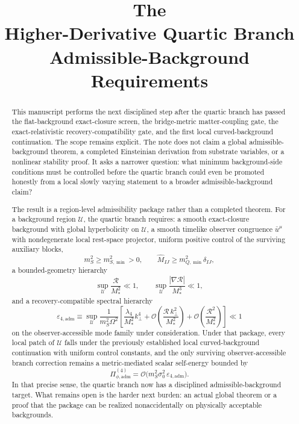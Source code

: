 \documentclass[11pt]{article}
\title{\textbf{The \TheoryName{}}\\[0.4em]
\large Higher-Derivative Quartic Branch Admissible-Background Requirements}
\author{}
\date{}
\begin{document}
\maketitle

\begin{abstract}
This manuscript performs the next disciplined step after the quartic branch has passed the flat-background exact-closure screen, the bridge-metric matter-coupling gate, the exact-relativistic recovery-compatibility gate, and the first local curved-background continuation. The scope remains explicit. The note does not claim a global admissible-background theorem, a completed Einsteinian derivation from substrate variables, or a nonlinear stability proof. It asks a narrower question: what minimum background-side conditions must be controlled before the quartic branch could even be promoted honestly from a local slowly varying statement to a broader admissible-background claim?

The result is a region-level admissibility package rather than a completed theorem. For a background region \(\mathcal U\), the quartic branch requires: a smooth exact-closure background with global hyperbolicity on \(\mathcal U\), a smooth timelike observer congruence \(\bar u^\mu\) with nondegenerate local rest-space projector, uniform positive control of the surviving auxiliary blocks,
\[
m_S^2\ge m_{S,\min}^2>0,
\qquad
\widehat M_{IJ}\ge m_{Q,\min}^2\delta_{IJ},
\]
a bounded-geometry hierarchy
\[
\sup_{\mathcal U}\frac{\mathcal R}{M_*^2}\ll 1,
\qquad
\sup_{\mathcal U}\frac{|\nabla\mathcal R|}{M_*^3}\ll 1,
\]
and a recovery-compatible spectral hierarchy
\[
\varepsilon_{4,\mathrm{adm}}
\equiv
\sup_{\mathcal U}
\frac{1}{m_S^2\Omega^2}
\left[
\frac{\lambda_4}{M_*^2}k_\perp^4
+ \mathcal O\!\left(\frac{\mathcal R\,k_\perp^2}{M_*^2}\right)
+ \mathcal O\!\left(\frac{\mathcal R^2}{M_*^2}\right)
\right]
\ll 1
\]
on the observer-accessible mode family under consideration. Under that package, every local patch of \(\mathcal U\) falls under the previously established local curved-background continuation with uniform control constants, and the only surviving observer-accessible branch correction remains a metric-mediated scalar self-energy bounded by
\[
\Pi_{\phi,\mathrm{adm}}^{(4)}
=
\mathcal O\!\bigl(m_S^2\sigma_0^2\,\varepsilon_{4,\mathrm{adm}}\bigr).
\]
In that precise sense, the quartic branch now has a disciplined admissible-background target. What remains open is the harder next burden: an actual global theorem or a proof that the package can be realized nonaccidentally on physically acceptable backgrounds.
\end{abstract}
\end{document}
